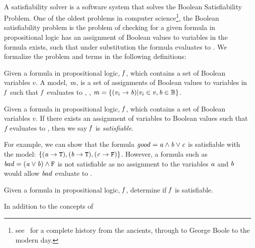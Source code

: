 ~\label{section:sat-solving}


A satisfiability solver is a software system that solves the Boolean
Satisfiability Problem. One of the oldest problems in computer
science\footnote{see~\citet{BBH+09} for a complete history from the ancients,
  through to George Boole to the modern day.}, the Boolean satisfiability
problem is the problem of checking for a given formula in propositional logic
has an assignment of Boolean values to variables in the formula exists, such
that under substitution the formula evaluates to \tru{}. We formalize the
problem and terms in the following definitions:

\begin{definition}[Model]
  Given a formula in propositional logic, $\mathit{f}$, which contains a set of
  Boolean variables $v$. A model, $\mathit{m}$, is a set of assignments of Boolean
  values to variables in $\mathit{f}$ such that $\mathit{f}$ evaluates to \tru{}, \ie{},
  $\mathit{m = \{ (v_{i} \rightarrow{} b) | v_{i} \in v, b \in \mathbb{B}} \}$.
\end{definition}

\begin{definition}[Satisfiable]
  Given a formula in propositional logic, $\mathit{f}$, which contains a set of
  Boolean variables $v$. If there exists an assignment of variables to Boolean
  values such that $f$ evaluates to \tru{}, then we say $\mathit{f}$ is
  \emph{satisfiable}.
\end{definition}

For example, we can show that the formula $\mathit{good = a \wedge b \vee c}$ is
satisfiable with the model: $\{\mathit{(a \rightarrow{} \texttt{T}{}), (b \rightarrow{}
  \texttt{T}{}), (c \rightarrow{} \texttt{F}{})}\}$. However, a formula such as $\mathit{bad =
  (a \vee b) \wedge \texttt{F}{}}$ is not satisfiable as no assignment to the
variables $\mathit{a}$ and $\mathit{b}$ would allow $\mathit{bad}$ evaluate to \tru{}.

\begin{definition}
  Given a formula in propositional logic, $\mathit{f}$, determine if $\mathit{f}$ is satisfiable.
\end{definition}

In addition to the concepts of



